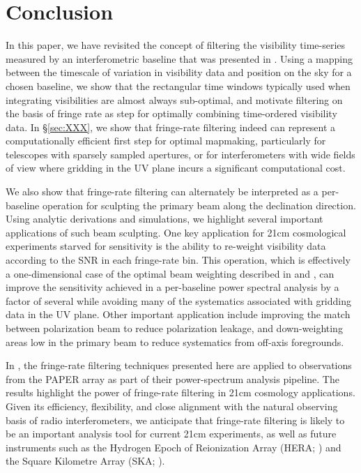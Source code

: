 \documentclass[twocolumn,apj,numberedappendix]{emulateapj}
\begin{document}


\section{Conclusion}
\label{sec:conclusion}

In this paper, we have revisited the concept of filtering the visibility time-series
measured by an interferometric baseline that was presented in \citet{parsons_backer2009}.
Using a mapping between the timescale of variation in visibility data and position
on the sky for a chosen baseline, we show that the rectangular time windows typically
used when integrating visibilities are almost always sub-optimal, and motivate 
filtering on the basis of fringe rate
as step for optimally combining time-ordered visibility data.  In \S\ref{sec:XXX}, we show 
that fringe-rate filtering indeed can represent a computationally efficient first step
for optimal mapmaking, particularly for telescopes with sparsely sampled apertures, or
for interferometers with wide fields of view where gridding in the UV plane incurs a significant
computational cost.

We also show that fringe-rate filtering can alternately be interpreted as a per-baseline
operation for sculpting the primary beam along the declination direction.  Using analytic
derivations and simulations, we highlight several important applications of such beam
sculpting.  One key application for 21cm cosmological experiments starved for sensitivity
is the ability to re-weight visibility data according to the SNR in each fringe-rate bin.
This operation, which is effectively a one-dimensional case of the optimal beam
weighting described in \citet{morales_matejek2009} and \citet{bhatnagar_et_al2008}, 
can improve the sensitivity achieved in a per-baseline power spectral analysis by a factor
of several %
while avoiding many of the systematics associated with gridding data in the UV plane.
Other important application include improving the match between polarization beam to
reduce polarization leakage, and down-weighting areas low in the primary beam
to reduce systematics from off-axis foregrounds.

In \citet{ali_et_al2015}, the fringe-rate filtering techniques presented here are applied to
observations from the PAPER array as part of their power-spectrum analysis pipeline.  The
results highlight the power of fringe-rate filtering in 21cm cosmology applications.
Given its efficiency, flexibility, and close alignment with the natural observing
basis of radio interferometers, we anticipate that fringe-rate filtering is likely to be
an important analysis tool for current 21cm experiments, as well as future instruments
such as the Hydrogen Epoch of Reionization Array (HERA; \citealt{pober_et_al2014}) and
the Square Kilometre Array (SKA; \citealt{XXX}).
\end{document}
